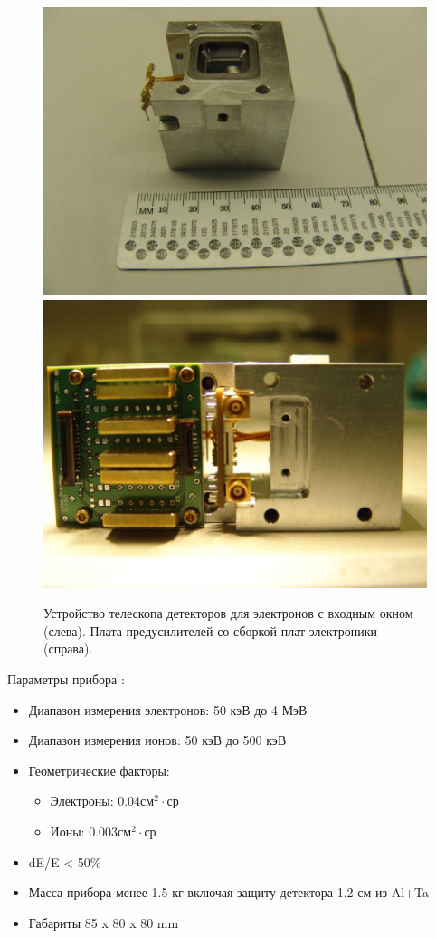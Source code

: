 \begin{figure}
	\centering
	\includegraphics[width=0.49\linewidth]{images/elfin/DSC04260}
	\includegraphics[width=0.49\linewidth]{images/elfin/DSC04287}
	\caption{Устройство телескопа детекторов для электронов с входным окном (слева). 	Плата предусилителей со сборкой плат электроники (справа). }
	\label{fig:dsc04260}
\end{figure}


Параметры прибора :
\begin{itemize}
	\item Диапазон измерения электронов: 50 кэВ до 4 МэВ
	
	\item Диапазон измерения ионов: 50 кэВ до 500 кэВ
	
	\item Геометрические факторы:
	
	\begin{itemize}
		\item Электроны: 0.04см$ ^{2}\cdot $ср
		
		\item Ионы: 0.003см$ ^{2}\cdot $ср
	\end{itemize}
	
	
	\item dE/E < 50\%
	
	\item Масса прибора менее 1.5 кг включая защиту детектора 1.2 см из Al+Ta
	
	\item Габариты 85 x 80 x 80 mm
\end{itemize}


